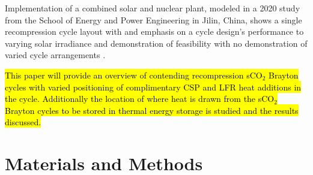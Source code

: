 Implementation of a combined solar and nuclear plant, modeled in a 2020 study from the School of Energy and Power Engineering in Jilin, China, shows a single recompression cycle layout with and emphasis on a cycle design's performance to varying solar irradiance and demonstration of feasibility with no demonstration of varied cycle arrangements \cite{wang_2020}.

\hl{This paper will provide an overview of contending recompression sCO$_2$ Brayton cycles with varied positioning of complimentary CSP and LFR heat additions in the cycle. Additionally the location of where heat is drawn from the sCO$_2$ Brayton cycles to be stored in thermal energy storage is studied and the results discussed.}



 
\section{Materials and Methods}



